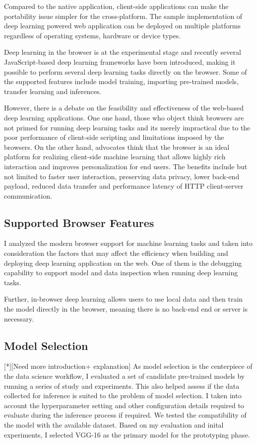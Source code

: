 Compared to the native application, client-side applications can make the portability issue simpler for the cross-platform. The sample implementation of deep learning powered web application can be deployed on multiple platforms regardless of operating systems, hardware or device types.

Deep learning in the browser is at the experimental stage and recently several JavaScript-based deep learning frameworks have been introduced, making it possible to perform several deep learning tasks directly on the browser. Some of the supported features include model training, importing pre-trained models, transfer learning and inferences.

However, there is a debate on the feasibility and effectiveness of the web-based deep learning applications. One one hand, those who object think browsers are not primed for running deep learning tasks and its merely impractical due to the poor performance of client-side scripting and limitations imposed by the browsers. On the other hand, advocates think that the browser is an ideal platform for realizing client-side machine learning that allows highly rich interaction and improves personalization for end users. The benefits include but not limited to faster user interaction, preserving data privacy, lower back-end payload, reduced data transfer and performance latency of HTTP client-server communication.

\subsection{Supported Browser Features}
I analyzed the modern browser support for machine learning tasks and taken into consideration the factors that may affect the efficiency when building and deploying deep learning application on the web. One of them is the debugging capability to support model and data inspection when running deep learning tasks.

Further, in-browser deep learning allows users to use local data and then train the model directly in the browser, meaning there is no back-end end or server is necessary. 

\subsection{Model Selection}
[*][Need more introduction+ explanation]
As model selection is the centerpiece of the data science workflow, I evaluated a set of candidate pre-trained models by running a series of study and experiments. This also helped assess if the data collected for inference is suited to the problem of model selection. I taken into account the hyperparameter setting and other configuration details required to evaluate during the inference process if required. We tested the compatibility of the model with the available dataset. Based on my evaluation and inital experiments, I selected VGG-16 as the primary model for the prototyping phase.

